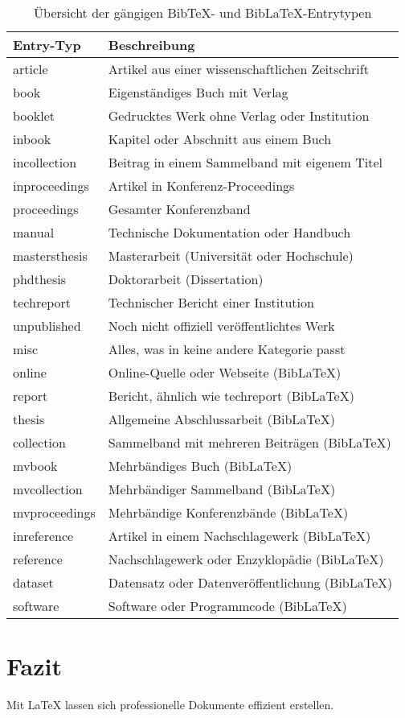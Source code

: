 \documentclass[a4paper,12pt]{article}
\begin{document}
\begin{table}[h!]
    \centering
    \begin{tabular}{ll}
    \textbf{Entry-Typ} & \textbf{Beschreibung} \\ \hline
    article & Artikel aus einer wissenschaftlichen Zeitschrift \\
    book & Eigenständiges Buch mit Verlag \\
    booklet & Gedrucktes Werk ohne Verlag oder Institution \\
    inbook & Kapitel oder Abschnitt aus einem Buch \\
    incollection & Beitrag in einem Sammelband mit eigenem Titel \\
    inproceedings & Artikel in Konferenz-Proceedings \\
    proceedings & Gesamter Konferenzband \\
    manual & Technische Dokumentation oder Handbuch \\
    mastersthesis & Masterarbeit (Universität oder Hochschule) \\
    phdthesis & Doktorarbeit (Dissertation) \\
    techreport & Technischer Bericht einer Institution \\
    unpublished & Noch nicht offiziell veröffentlichtes Werk \\
    misc & Alles, was in keine andere Kategorie passt \\
    online & Online-Quelle oder Webseite (BibLaTeX) \\
    report & Bericht, ähnlich wie techreport (BibLaTeX) \\
    thesis & Allgemeine Abschlussarbeit (BibLaTeX) \\
    collection & Sammelband mit mehreren Beiträgen (BibLaTeX) \\
    mvbook & Mehrbändiges Buch (BibLaTeX) \\
    mvcollection & Mehrbändiger Sammelband (BibLaTeX) \\
    mvproceedings & Mehrbändige Konferenzbände (BibLaTeX) \\
    inreference & Artikel in einem Nachschlagewerk (BibLaTeX) \\
    reference & Nachschlagewerk oder Enzyklopädie (BibLaTeX) \\
    dataset & Datensatz oder Datenveröffentlichung (BibLaTeX) \\
    software & Software oder Programmcode (BibLaTeX) \\
    \end{tabular}
    \caption{Übersicht der gängigen BibTeX- und BibLaTeX-Entrytypen}
    \end{table}
    
\section{Fazit}
Mit \LaTeX{} lassen sich professionelle Dokumente effizient erstellen.

\newpage
\printbibliography
\end{document}
